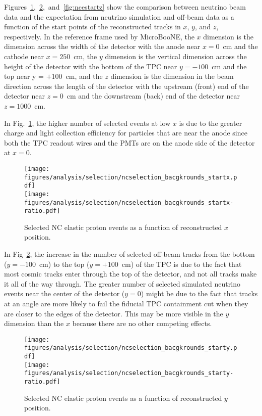     Figures~\ref{fig:ncestartx},~\ref{fig:ncestarty},~and~\ref{fig:ncestartz}
    show the comparison between neutrino beam data and the expectation from
    neutrino simulation and off-beam data as a function of the start points of
    the reconstructed tracks in $x$, $y$, and $z$, respectively. In the
    reference frame used by MicroBooNE, the $x$ dimension is the dimension
    across the width of the detector with the anode near $x = 0$~cm and the
    cathode near $x = 250$~cm, the $y$ dimension is the vertical dimension
    across the height of the detector with the bottom of the TPC near $y =
    -100$~cm and the top near y = $+100$~cm, and the $z$ dimension is the
    dimension in the beam direction across the length of the detector with the
    upstream (front) end of the detector near $z = 0$~cm and the downstream
    (back) end of the detector near $z = 1000$~cm.
    
    In Fig.~\ref{fig:ncestartx}, the higher number of selected events at low
    $x$ is due to the greater charge and light collection efficiency for
    particles that are near the anode since both the TPC readout wires and the
    PMTs are on the anode side of the detector at $x = 0$.
    \begin{figure}[ht]
      \centering
      \texttt{[image: figures/analysis/selection/ncselection\_bacgkrounds\_startx.pdf]} \\
      \texttt{[image: figures/analysis/selection/ncselection\_bacgkrounds\_startx-ratio.pdf]} \\
      \caption{Selected NC elastic proton events as a function of reconstructed $x$ position.}
      \label{fig:ncestartx}
    \end{figure}

    In Fig~\ref{fig:ncestarty}, the increase in the number of selected off-beam
    tracks from the bottom ($y = -100$~cm) to the top ($y = +100$~cm) of the
    TPC is due to the fact that most cosmic tracks enter through the top of the
    detector, and not all tracks make it all of the way through. The greater
    number of selected simulated neutrino events near the center of the
    detector ($y = 0$) might be due to the fact that tracks at an angle are
    more likely to fail the fiducial TPC containment cut when they are closer
    to the edges of the detector. This may be more visible in the $y$ dimension
    than the $x$ because there are no other competing effects.
    \begin{figure}[ht]
      \centering
      \texttt{[image: figures/analysis/selection/ncselection\_bacgkrounds\_starty.pdf]} \\
      \texttt{[image: figures/analysis/selection/ncselection\_bacgkrounds\_starty-ratio.pdf]} \\
      \caption{Selected NC elastic proton events as a function of reconstructed $y$ position.}
      \label{fig:ncestarty}
    \end{figure}

